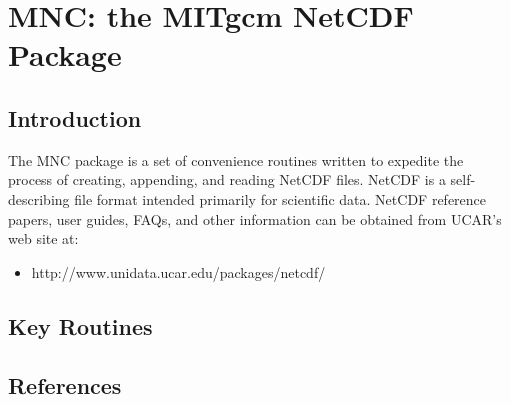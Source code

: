 


\section{MNC: the MITgcm NetCDF Package}

\subsection{Introduction}

The MNC package is a set of convenience routines written to expedite
the process of creating, appending, and reading NetCDF files.  NetCDF
is a self-describing file format \cite{rew:97} intended primarily for
scientific data.  NetCDF reference papers, user guides, FAQs, and other
information can be obtained from UCAR's web site at:

\begin{itemize}
\item http://www.unidata.ucar.edu/packages/netcdf/
\end{itemize}




\subsection{Key Routines}



\subsection{References}
